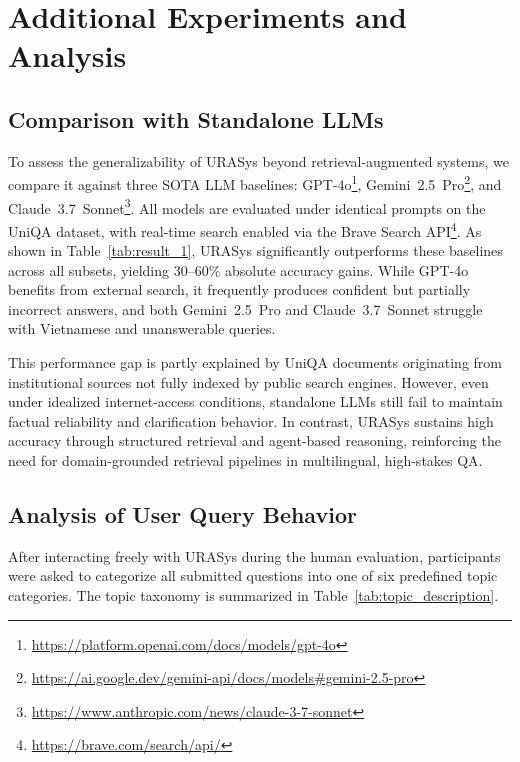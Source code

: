 \documentclass[11pt]{article}
\begin{document}
\section{Additional Experiments and Analysis}
\label{sec:further_experiments}

\subsection{Comparison with Standalone LLMs}

To assess the generalizability of URASys beyond retrieval-augmented systems, we compare it against three SOTA LLM baselines: GPT-4o\footnote{\url{https://platform.openai.com/docs/models/gpt-4o}}, Gemini~2.5~Pro\footnote{\url{https://ai.google.dev/gemini-api/docs/models\#gemini-2.5-pro}}, and Claude~3.7~Sonnet\footnote{\url{https://www.anthropic.com/news/claude-3-7-sonnet}}. All models are evaluated under identical prompts on the UniQA dataset, with real-time search enabled via the Brave Search API\footnote{\url{https://brave.com/search/api/}}. As shown in Table~\ref{tab:result_1}, URASys significantly outperforms these baselines across all subsets, yielding 30--60\% absolute accuracy gains. While GPT-4o benefits from external search, it frequently produces confident but partially incorrect answers, and both Gemini~2.5~Pro and Claude~3.7~Sonnet struggle with Vietnamese and unanswerable queries.

This performance gap is partly explained by UniQA documents originating from institutional sources not fully indexed by public search engines. However, even under idealized internet-access conditions, standalone LLMs still fail to maintain factual reliability and clarification behavior. In contrast, URASys sustains high accuracy through structured retrieval and agent-based reasoning, reinforcing the need for domain-grounded retrieval pipelines in multilingual, high-stakes QA.


\subsection{Analysis of User Query Behavior}

After interacting freely with URASys during the human evaluation, participants were asked to categorize all submitted questions into one of six predefined topic categories. The topic taxonomy is summarized in Table~\ref{tab:topic_description}.

\end{document}
